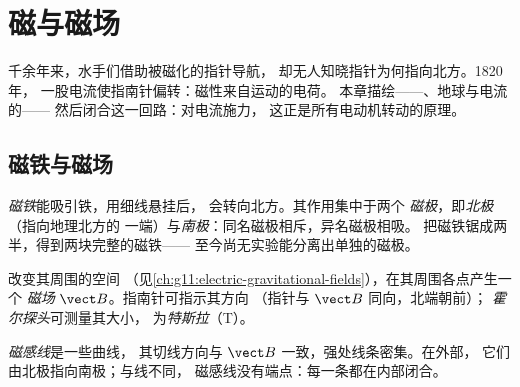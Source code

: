 \chapter{磁与磁场}\label{ch:g11:magnetic-fields}

千余年来，水手们借助被磁化的指针导航，
却无人知晓指针为何指向北方。1820 年，
一股电流使指南针偏转：磁性来自运动的电荷。
本章描绘——、地球与电流的——
然后闭合这一回路：对电流施力，
这正是所有电动机转动的原理。

\section{磁铁与磁场}

\begin{definition}[磁铁与磁极]\label{def:g11:magnetic-fields:magnet}
\emph{磁铁}能吸引铁，用细线悬挂后，
会转向北方。其作用集中于两个
\emph{磁极}，即\emph{北极}（指向地理北方的
一端）与\emph{南极}：同名磁极相斥，异名磁极相吸。
把磁铁锯成两半，得到两块完整的磁铁——
至今尚无实验能分离出单独的磁极。
\end{definition}

\begin{definition}[磁场]\label{def:g11:magnetic-fields:bfield}
改变其周围的空间
（见\cref{ch:g11:electric-gravitational-fields}），在其周围各点产生一个
\emph{磁场} $\vect B$。指南针可指示其方向
（指针与 $\vect B$ 同向，北端朝前）；
\emph{霍尔探头}可测量其大小，
为\emph{特斯拉}（\unit{T}）。
\end{definition}

\begin{definition}[磁感线]\label{def:g11:magnetic-fields:lines}
\emph{磁感线}是一些曲线，
其切线方向与 $\vect B$ 一致，强处线条密集。在外部，
它们由北极指向南极；与线不同，
磁感线没有端点：每一条都在内部闭合。
\end{definition}

